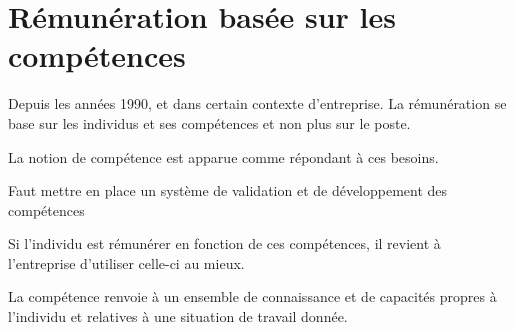 \section{Rémunération basée sur les compétences}
Depuis les années 1990, et dans certain contexte d'entreprise. La rémunération se base sur les individus et ses compétences et non plus sur le poste. 

La notion de compétence est apparue comme répondant à ces besoins. 

Faut mettre en place un système de validation et de développement des compétences

Si l'individu est rémunérer en fonction de ces compétences, il revient à l'entreprise d'utiliser celle-ci au mieux. 

La compétence renvoie à un ensemble de connaissance et de capacités propres à l'individu et relatives à une situation de travail donnée. 
